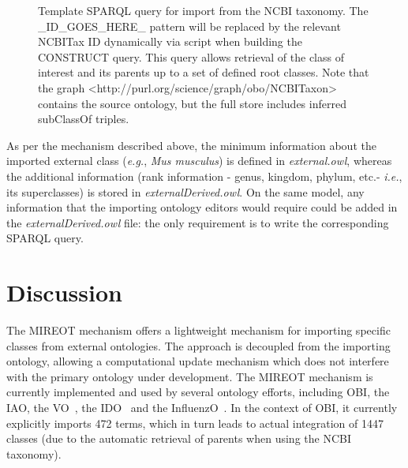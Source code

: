 \documentclass[jou]{ao2e}%
\begin{document}
\begin{figure}[t]
\scriptsize
 
\caption{Template SPARQL query for import from the NCBI taxonomy. The \_ID\_GOES\_HERE\_ pattern will be replaced by the relevant NCBITax ID dynamically via script when building the CONSTRUCT query. This query allows retrieval of the class of interest and its parents up to a set of defined root classes. Note that the graph <http://purl.org/science/graph/obo/NCBITaxon> contains the source ontology, but the full store includes inferred subClassOf triples.}
\label{fig:sparql2}
\end{figure}
As per the mechanism described above, the minimum information about the imported external class (\emph{e.g.}, \emph{Mus musculus}) is defined in \emph{external.owl}, whereas the additional information (rank information - genus, kingdom, phylum, etc.- \emph{i.e.}, its  superclasses) is stored in \emph{ externalDerived.owl}.
On the same model, any information that the importing ontology editors would require could be added in the \emph{externalDerived.owl} file: the only requirement is to write the corresponding SPARQL query.


\section*{Discussion}

The MIREOT mechanism offers a lightweight mechanism for importing specific classes from external ontologies. The approach is decoupled from the importing ontology, allowing a computational update mechanism which does not interfere with the primary ontology under development. The \ac{MIREOT} mechanism is currently implemented and used by several ontology efforts, including \ac{OBI}, the \ac{IAO}, the \ac{VO}~\citep{VO}, the \ac{IDO}~\citep{IDO} and the \ac{InfluenzO}~\citep{InfluenzO}.
In the context of \ac{OBI}, it currently explicitly imports 472 terms, which in turn leads to actual integration of 1447 classes (due to the automatic retrieval of parents when using the NCBI taxonomy). 
\end{document}
